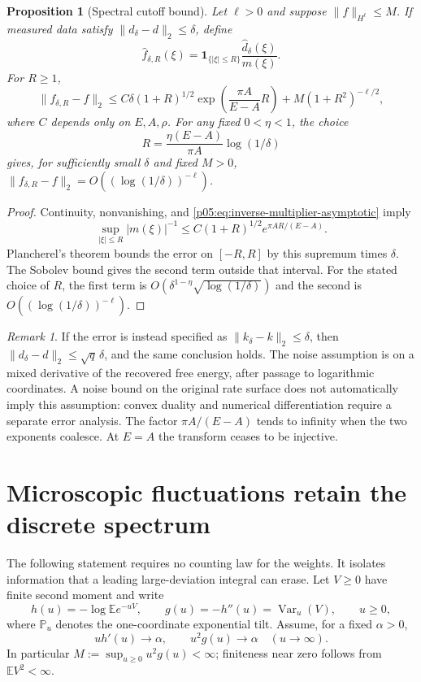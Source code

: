 \documentclass[11pt,letterpaper]{article}
\newtheorem{proposition}[theorem]{Proposition}
\theoremstyle{definition}
\theoremstyle{remark}
\newtheorem{remark}[theorem]{Remark}
\newcommand{\1}{\mathbf 1}
\begin{document}
\begin{proposition}[Spectral cutoff bound]\label{p05:prop:inverse-cutoff}
Let $\ell>0$ and suppose $\|f\|_{H^\ell}\le M$.  If measured data satisfy
$\|d_\delta-d\|_2\le\delta$, define
\[
 \widehat f_{\delta,R}(\xi)
 =\mathbf 1_{\{|\xi|\le R\}}\frac{\widehat d_\delta(\xi)}{m(\xi)}.
\]
For $R\ge1$,
\begin{equation}\label{p05:eq:inverse-cutoff-bound}
 \|f_{\delta,R}-f\|_2
 \le C\delta(1+R)^{1/2}
       \exp\!\left(\frac{\pi A}{E-A}R\right)
       +M(1+R^2)^{-\ell/2},
\end{equation}
where $C$ depends only on $E,A,\rho$.  For any fixed $0<\eta<1$,
the choice
\[
 R=\frac{\eta(E-A)}{\pi A}\log(1/\delta)
\]
gives, for sufficiently small $\delta$ and fixed $M>0$,
$\|f_{\delta,R}-f\|_2=O((\log(1/\delta))^{-\ell})$.
\end{proposition}

\begin{proof}
Continuity, nonvanishing, and
\eqref{p05:eq:inverse-multiplier-asymptotic} imply
\[
 \sup_{|\xi|\le R}|m(\xi)|^{-1}
 \le C(1+R)^{1/2}e^{\pi AR/(E-A)}.
\]
Plancherel's theorem bounds the error on $[-R,R]$ by this supremum
times $\delta$.  The Sobolev bound gives the second term outside that
interval.  For the stated choice of $R$, the first term is
$O(\delta^{1-\eta}\sqrt{\log(1/\delta)})$ and the second is
$O((\log(1/\delta))^{-\ell})$.
\end{proof}

\begin{remark}
If the error is instead specified as $\|k_\delta-k\|_2\le\delta$, then
$\|d_\delta-d\|_2\le\sqrt q\,\delta$, and the same conclusion holds.
The noise assumption is on a mixed derivative of the recovered free
energy, after passage to logarithmic coordinates.  A noise bound on the
original rate surface does not automatically imply this assumption:
convex duality and numerical differentiation require a separate error
analysis.  The factor $\pi A/(E-A)$ tends to infinity when the two
exponents coalesce.  At $E=A$ the transform ceases to be injective.
\end{remark}


\section{Microscopic fluctuations retain the discrete spectrum}
\label{p05:sec:microscopic-fluctuations}

The following statement requires no counting law for the weights.  It
isolates information that a leading large-deviation integral can erase.
Let $V\ge0$ have finite second moment and write
\[
 h(u)=-\log\mathbb E e^{-uV},\qquad
 g(u)=-h''(u)=\operatorname{Var}_{u}(V),\qquad u\ge0,
\]
where $\mathbb P_u$ denotes the one-coordinate exponential tilt.
Assume, for a fixed $\alpha>0$,
\begin{equation}\label{p05:eq:microscopic-one-site-hypotheses}
 uh'(u)\longrightarrow\alpha,
 \qquad u^2g(u)\longrightarrow\alpha
 \quad(u\to\infty).
\end{equation}
In particular $M:=\sup_{u\ge0}u^2g(u)<\infty$; finiteness near zero
follows from $\mathbb E V^2<\infty$.
\end{document}
